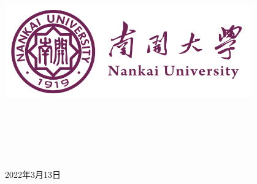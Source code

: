 \documentclass[a4paper]{article}
\newcommand{\HRule}{\rule{\linewidth}{0.5mm}}%
\begin{document}
\renewcommand{\contentsname}{目\ 录}
\renewcommand{\appendixname}{附录}
\renewcommand{\appendixpagename}{附录}
\renewcommand{\refname}{参考文献} 
\renewcommand{\figurename}{图}
\renewcommand{\tablename}{表}
\renewcommand{\today}{\number\year 年 \number\month 月 \number\day 日}

\begin{titlepage}
    \begin{center}
    \includegraphics[width=0.8\textwidth]{NKU.png}\\[1cm]
    \vspace{20mm}
		\textbf{\huge\textbf{}}\\[0.5cm]
		\textbf{\huge{}}\\[2.3cm]
		\textbf{\Huge\textbf{}}

		\vspace{\fill}
    
    \centering
    \textsc{\LARGE {}}\\[0.5cm]
    \textsc{\LARGE {}}\\[0.5cm]
    \textsc{\LARGE {}}\\[0.5cm]
    
    \vfill
    {\Large 2022年3月13日}
    \end{center}
\end{titlepage}

\renewcommand {\thefigure}{\thesection{}.\arabic{figure}}%
\renewcommand{\figurename}{图}
\renewcommand{\contentsname}{目录}  


\clearpage
\tableofcontents
\newpage

\end{document}
